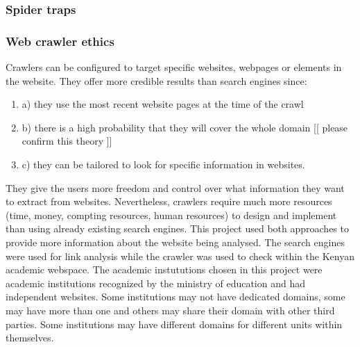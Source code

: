\subsubsection{Spider traps}
\subsubsection{Web crawler ethics}
Crawlers can be configured to target specific websites, webpages or elements in the website. They offer more credible results than search engines since:
\begin{enumerate}
\item a) they use the most recent website pages at the time of the crawl
\item b) there is a high probability that they will cover the whole domain [[ please confirm this theory ]]
\item c) they can be tailored to look for specific information in websites.
\end{enumerate}
They give the users more freedom and control over what information they want to extract from
websites. Nevertheless, crawlers require much more resources (time, money, compting resources,
human resources) to design and implement than using already existing search engines.
This project used both approaches to provide more information about the website being analysed.
The search engines were used for link analysis while the crawler was used to check within the
Kenyan academic webspace.
The academic instututions chosen in this project were academic institutions recognized by the
ministry of education and had independent websites. Some institutions may not have dedicated
domains, some may have more than one and others may share their domain with other third
parties. Some institutions may have different domains for different units within themselves.

